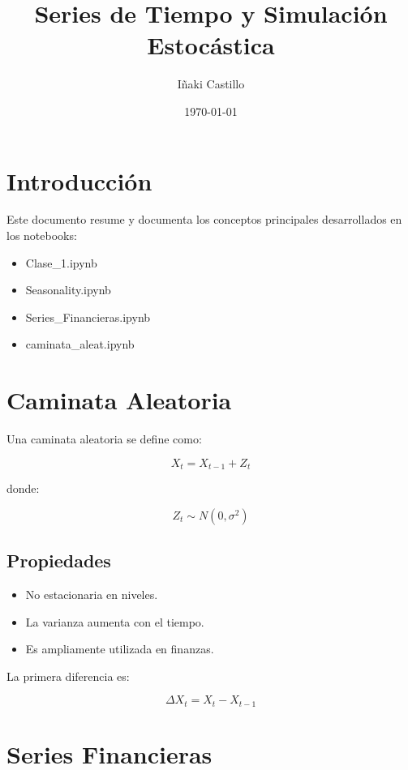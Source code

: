 \documentclass[12pt]{article}
\title{Series de Tiempo y Simulación Estocástica}
\author{Iñaki Castillo}
\date{\today}
\begin{document}
\maketitle

\section{Introducción}

Este documento resume y documenta los conceptos principales desarrollados en los notebooks:
\begin{itemize}
    \item Clase\_1.ipynb
    \item Seasonality.ipynb
    \item Series\_Financieras.ipynb
    \item caminata\_aleat.ipynb
\end{itemize}

\section{Caminata Aleatoria}

Una caminata aleatoria se define como:

\begin{equation}
X_t = X_{t-1} + Z_t
\end{equation}

donde:

\begin{equation}
Z_t \sim N(0,\sigma^2)
\end{equation}

\subsection{Propiedades}

\begin{itemize}
    \item No estacionaria en niveles.
    \item La varianza aumenta con el tiempo.
    \item Es ampliamente utilizada en finanzas.
\end{itemize}

La primera diferencia es:

\begin{equation}
\Delta X_t = X_t - X_{t-1}
\end{equation}

\section{Series Financieras}
\end{document}
